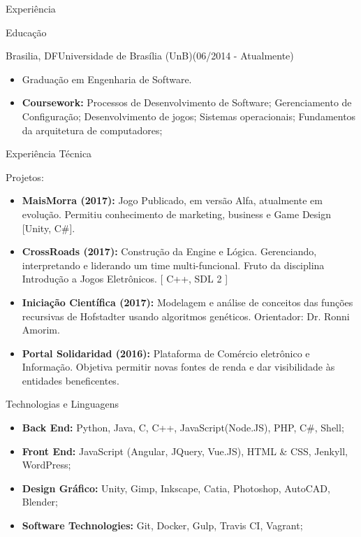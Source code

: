 \documentclass[]{fraguilarcv}
\begin{document}
\begin{cvsection}{Experiência}
	\begin{cvsection}{Educação}
		\begin{cvsubsection}{Brasilia, DF}{Universidade de Brasília (UnB)}{(06/2014 - Atualmente)}
			\begin{itemize}
				\item Graduação em Engenharia de Software.
				\item \textbf{Coursework:} {Processos de Desenvolvimento de Software; Gerenciamento de Configuração; Desenvolvimento de jogos; Sistemas operacionais; Fundamentos da arquitetura de computadores;}
			\end{itemize}
		\end{cvsubsection}
	\end{cvsection}

	\begin{cvsection}{Experiência Técnica}
		\begin{cvsubsection}{Projetos:}{}{}
			\begin{itemize}
	    	\item \textbf{MaisMorra (2017):} Jogo Publicado, em versão Alfa, atualmente em evolução. Permitiu conhecimento de marketing, business e Game Design [Unity, C\#].
			\item \textbf{CrossRoads (2017):} Construção da Engine e Lógica. Gerenciando, interpretando e liderando um time multi-funcional. Fruto da disciplina Introdução a Jogos Eletrônicos. [ C++, SDL 2 ]
			\item \textbf{Iniciação Científica (2017):} Modelagem e análise de conceitos das funções recursivas de Hofstadter usando algoritmos genéticos. Orientador: Dr. Ronni Amorim.
	      	\item \textbf{Portal Solidaridad (2016):} Plataforma de Comércio eletrônico e Informação. Objetiva permitir novas fontes de renda e dar visibilidade às entidades beneficentes.
			\end{itemize}
		\end{cvsubsection}
	\end{cvsection}

	\begin{cvsection}{Technologias e Linguagens}
		\begin{cvsubsection}{}{}{}
			\begin{itemize}
			\item \textbf{Back End:} Python, Java, C, C++, JavaScript(Node.JS), PHP, C\#, Shell;
            \item \textbf{Front End:} JavaScript (Angular, JQuery, Vue.JS), HTML \& CSS, Jenkyll, WordPress;
			\item \textbf{Design Gráfico:} Unity, Gimp, Inkscape, Catia, Photoshop, AutoCAD, Blender;
	      	\item \textbf{Software Technologies:} Git, Docker, Gulp, Travis CI, Vagrant;
			\end{itemize}
		\end{cvsubsection}
	\end{cvsection}
\end{cvsection}
\end{document}

